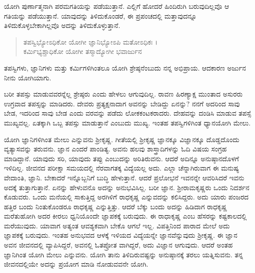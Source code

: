 ಯೋಗಿ ಪುರ್ಣಾತ್ಮನಾಗಿ ಪರಮಗತಿಯನ್ನು ಪಡೆಯುತ್ತಾನೆ. ಎಲ್ಲಿಗೆ ಹೋದರೆ ಹಿಂದಿರುಗಿ ಬರುವುದಿಲ್ಲವೊ ಆ ಗತಿಯನ್ನು ಪಡೆಯುತ್ತಾನೆ. ಯಾವುದನ್ನು ತಿಳಿದುಕೊಂಡರೆ, ಈ ಪ್ರಪಂಚದಲ್ಲಿ ಮತ್ತಾವುದನ್ನೂ ತಿಳಿದುಕೊಳ್ಳಬೇಕಾಗಿಲ್ಲವೊ ಅದನ್ನು ತಿಳಿದುಕೊಳ್ಳುತ್ತಾನೆ.

\begin{verse}
ತಪಸ್ವಿಭ್ಯೋಽಧಿಕೋ ಯೋಗೀ ಜ್ಞಾನಿಭ್ಯೋಽಪಿ ಮತೋಽಧಿಕಃ ।\\ಕರ್ಮಿಭ್ಯಶ್ಚಾಧಿಕೋ ಯೋಗೀ ತಸ್ಮಾದ್ಯೋಗೀ ಭವಾರ್ಜುನ 
\end{verse}

{\small ತಪಸ್ವಿಗಳು, ಜ್ಞಾನಿಗಳು ಮತ್ತು ಕರ್ಮಿಗಳಿಗಿಂತಲೂ ಯೋಗಿ ಶ್ರೇಷ್ಠನೆಂಬುದು ನನ್ನ ಅಭಿಪ್ರಾಯ. ಆದಕಾರಣ ಅರ್ಜುನ ನೀನು ಯೋಗಿಯಾಗು.}

ಬರೀ ತಪಸ್ಸು ಮಾಡುವವರನ್ನೆಲ್ಲ ಶ್ರೇಷ್ಠರು ಎಂದು ಹೇಳಲು ಆಗುವುದಿಲ್ಲ. ರಾವಣ ಹಿರಣ್ಯಾಕ್ಷ ಮುಂತಾದ ಅಸುರರು ಉಗ್ರವಾದ ತಪಸ್ಸನ್ನು ಮಾಡಿದರು. ದೇವರು ಪ್ರತ್ಯಕ್ಷನಾದಾಗ ಅವನನ್ನು ಬೇಡಿದ್ದು ಏನನ್ನು? ನನಗೆ ಅದರಿಂದ ಸಾವು ಬೇಡ, ಇದರಿಂದ ಸಾವು ಬೇಡ ಎಂದು ವರವನ್ನು ಪಡೆದು ಲೋಕಕಂಟಕರಾದರು. ದೇಹವನ್ನು ದಂಡಿಸಿ ಮಾಡುವ ತಪಸ್ಸೆ ಮುಖ್ಯವಲ್ಲ. ಏತಕ್ಕಾಗಿ ಒಬ್ಬ ತಪಸ್ಸು ಮಾಡುತ್ತಾನೆ ಎಂಬುದು ಮುಖ್ಯ. ಇಂತಹ ತಪಸ್ವಿಗಳಿಗಿಂತ ಧ್ಯಾನಯೋಗಿ ಮೇಲು.

ಯೋಗಿ ಜ್ಞಾನಿಗಳಿಗಿಂತ ಮೇಲು ಎನ್ನುವನು ಶ್ರೀಕೃಷ್ಣ. ಗೀತೆಯಲ್ಲಿ ಶ್ರೀಕೃಷ್ಣ ಜ್ಞಾನಕ್ಕೂ ವಿಜ್ಞಾನಕ್ಕೂ ದೊಡ್ಡದೊಂದು ವ್ಯತ್ಯಾಸವನ್ನು ತರುವನು. ಜ್ಞಾನ ಎಂದರೆ ಪಾಂಡಿತ್ಯ. ಅವನು ಹಲವು ಶಾಸ್ತ್ರಾದಿಗಳನ್ನು ಓದಿ ವಿಷಯ ಸಂಗ್ರಹ ಮಾಡಿದ್ದಾನೆ. ಯಾವುದು ಸರಿ, ಯಾವುದು ತಪ್ಪು ಎಂಬುದನ್ನು ಅರಿತಿರುವನು. ಆದರೆ ಅದಿನ್ನೂ ಅನುಷ್ಠಾನದೊಳಗೆ ಇಳಿದಿಲ್ಲ. ಜೀವನದ ಪರೀಕ್ಷಾ ಸಮಯದಲ್ಲಿ ನೆರವಾಗತಕ್ಕ ವಿದ್ಯೆಯಲ್ಲ ಅದು. ಎಲ್ಲಾ ಚೆನ್ನಾಗಿರುವಾಗ ಈ ಮನುಷ್ಯ ವೇದಾಂತಿ, ಜ್ಞಾನಿ. ಬೇಕಾದರೆ ಇನ್ನೊಬ್ಬನಿಗೆ ಬುದ್ಧಿ ಹೇಳುತ್ತಾನೆ. ಆದರೆ ಪ್ರಲೋಭನೆ ಇವನನ್ನೇ ಆವರಿಸಿದರೆ ಇವನು ಅದಕ್ಕೆ ತುತ್ತಾಗುತ್ತಾನೆ. ಏನನ್ನು ಹೇಳುವನೊ ಅದನ್ನು ಅನುಭವಿಸಿಲ್ಲ. ಬರೀ ಜ್ಞಾನ. ಶ್ರೀರಾಮಕೃಷ್ಣರು ಒಂದು ನಿದರ್ಶನ ಕೊಡುವರು. ಒಂದು ಮನೆಯಲ್ಲಿ ಸಾಕುತ್ತಿದ್ದ ಅರಗಿಳಿಗೆ ರಾಧಕೃಷ್ಣ ಎನ್ನುವದನ್ನು ಕಲಿಸಿದ್ದರು. ಅದು ಯಾರು ಪಂಜರದ ಹತ್ತಿರ ಬಂದು ನಿಂತುಕೊಂಡರೂ ರಾಧಕೃಷ್ಣ ಎನ್ನುತ್ತಿತ್ತು. ಆದರೆ ಬೆಕ್ಕು ಬಂದು ಅದನ್ನು ಹಿಡಿದಾಗ ರಾಧಕೃಷ್ಣ ಮರೆತುಹೋಗಿ ಅದರ ಕೀರಲು ಧ್ವನಿಯೊಂದೇ ಜ್ಞಾಪಕಕ್ಕೆ ಬರುವುದು. ಈ ರಾಧಾಕೃಷ್ಣ ಎಂಬ ಹೆಸರನ್ನು ಕಷ್ಟಕಾಲದಲ್ಲಿ ಮರೆಯುವುದು. ಯಾವಾಗ ಅತ್ಯಂತ ಆವಶ್ಯಕವಾಗಿ ಬೇಕೊ ಆಗಲೆ ಇಲ್ಲ. ವಿಪತ್ತಿನಿಂದ ಪಾರಾದ ಮೇಲೆ ಅದು ಜ್ಞಾಪಕಕ್ಕೆ ಬರುವುದು. ಇಂತಹ ಅನುಭವದ ಆಳಕ್ಕೆ ಇಳಿಯದ ವಿದ್ಯೆಯನ್ನೇ ಜ್ಞಾನವೆನ್ನುವುದು ಶ್ರೀಕೃಷ್ಣ. ಈ ಜ್ಞಾನ ಅವನ ಜೀವನದಲ್ಲಿ ವ್ಯಾಪಿಸಿದ್ದರೆ, ಅವನಲ್ಲಿ ಓತಪ್ರೋತ ವಾಗಿದ್ದರೆ, ಅದು ವಿಜ್ಞಾನ ಆಗುವುದು. ಆದರೆ ಅಂತಹ ಜ್ಞಾನಿಗಿಂತ ಯೋಗಿ ಮೇಲು ಎನ್ನುವನು. ಯೋಗಿ ತಾನು ತಿಳಿದಿರುವಷ್ಟನ್ನು ಅನುಷ್ಠಾನಕ್ಕೆ ತರಲು ಯತ್ನಿಸುವನು. ತನ್ನ ಜೀವನದಲ್ಲಿಯೇ ಅದನ್ನು ಪ್ರಯೋಗ ಮಾಡಿ ನೋಡುವವನೇ ಯೋಗಿ.

